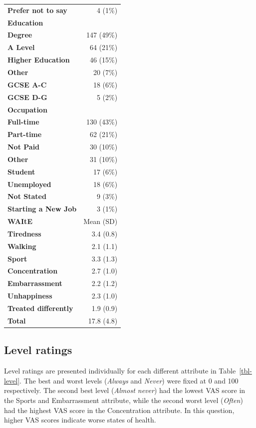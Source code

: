 \documentclass[
  number,
  preprint]{elsarticle}
\begin{document}
\begin{longtable*}[t]{>{}lr}
\textbf{Prefer not to say} & 4 (1\%)\\
\textbf{Education} & \\
\addlinespace
\textbf{Degree} & 147 (49\%)\\
\textbf{A Level} & 64 (21\%)\\
\textbf{Higher Education} & 46 (15\%)\\
\textbf{Other} & 20 (7\%)\\
\textbf{GCSE A-C} & 18 (6\%)\\
\addlinespace
\textbf{GCSE D-G} & 5 (2\%)\\
\textbf{Occupation} & \\
\textbf{Full-time} & 130 (43\%)\\
\textbf{Part-time} & 62 (21\%)\\
\textbf{Not Paid} & 30 (10\%)\\
\addlinespace
\textbf{Other} & 31 (10\%)\\
\textbf{Student} & 17 (6\%)\\
\textbf{Unemployed} & 18 (6\%)\\
\textbf{Not Stated} & 9 (3\%)\\
\textbf{Starting a New Job} & 3 (1\%)\\
\addlinespace
\textbf{WAItE} & Mean (SD)\\
\textbf{Tiredness} & 3.4 (0.8)\\
\textbf{Walking} & 2.1 (1.1)\\
\textbf{Sport} & 3.3 (1.3)\\
\textbf{Concentration} & 2.7 (1.0)\\
\addlinespace
\textbf{Embarrassment} & 2.2 (1.2)\\
\textbf{Unhappiness} & 2.3 (1.0)\\
\textbf{Treated differently} & 1.9 (0.9)\\
\textbf{Total} & 17.8 (4.8)\\
\bottomrule
\end{longtable*}

\subsection{Level ratings}\label{level-ratings-1}

Level ratings are presented individually for each different attribute in
Table~\ref{tbl-level}. The best and worst levels (\textit{Always} and
\textit{Never}) were fixed at 0 and 100 respectively. The second best
level (\textit{Almost never}) had the lowest VAS score in the Sports and
Embarrassment attribute, while the second worst level (\textit{Often})
had the highest VAS score in the Concentration attribute. In this
question, higher VAS scores indicate worse states of health.
\end{document}
